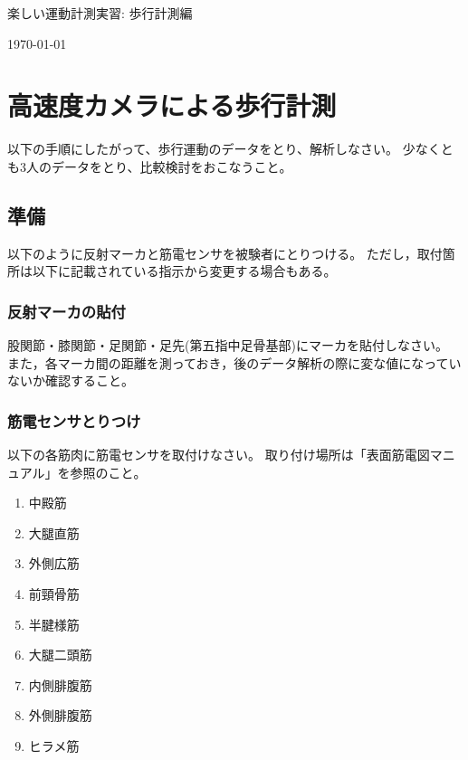 \documentclass{jarticle}
\begin{document}
\begin{center}
  {\LARGE 楽しい運動計測実習: 歩行計測編}
\end{center}
\begin{flushright}
  \today
  \end{flushright}

\section{高速度カメラによる歩行計測}

以下の手順にしたがって、歩行運動のデータをとり、解析しなさい。
少なくとも3人のデータをとり、比較検討をおこなうこと。


\subsection{準備}

以下のように反射マーカと筋電センサを被験者にとりつける。
ただし，取付箇所は以下に記載されている指示から変更する場合もある。

\subsubsection{反射マーカの貼付}
股関節・膝関節・足関節・足先(第五指中足骨基部)にマーカを貼付しなさい。
また，各マーカ間の距離を測っておき，後のデータ解析の際に変な値になっていないか確認すること。


\subsubsection{筋電センサとりつけ}
以下の各筋肉に筋電センサを取付けなさい。
取り付け場所は「表面筋電図マニュアル」を参照のこと。
\begin{enumerate}
\item 中殿筋
\item 大腿直筋
\item 外側広筋
\item 前頸骨筋
\item 半腱様筋
\item 大腿二頭筋
\item 内側腓腹筋
\item 外側腓腹筋
\item ヒラメ筋
\end{enumerate}
\end{document}
